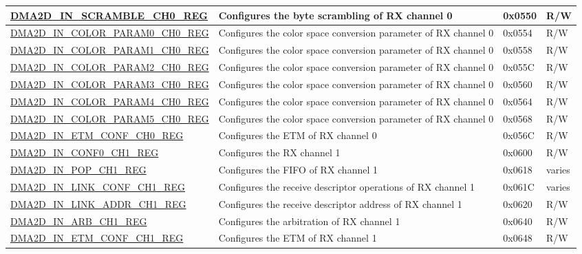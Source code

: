 \begin{longtable}{ | p{7cm} | p{11.5cm} | p{1.3cm} | p{2cm} | }
\hyperref[regdesc:DMA2DINSCRAMBLECH0REG]{DMA2D\_IN\_SCRAMBLE\_CH0\_REG} & Configures the byte scrambling of RX channel 0 & 0x0550 & R/W \\ \hline
\hyperref[regdesc:DMA2DINCOLORPARAM0CH0REG]{DMA2D\_IN\_COLOR\_PARAM0\_CH0\_REG} & Configures the color space conversion parameter of RX channel 0 & 0x0554 & R/W \\ \hline
\hyperref[regdesc:DMA2DINCOLORPARAM1CH0REG]{DMA2D\_IN\_COLOR\_PARAM1\_CH0\_REG} & Configures the color space conversion parameter of RX channel 0 & 0x0558 & R/W \\ \hline
\hyperref[regdesc:DMA2DINCOLORPARAM2CH0REG]{DMA2D\_IN\_COLOR\_PARAM2\_CH0\_REG} & Configures the color space conversion parameter of RX channel 0 & 0x055C & R/W \\ \hline
\hyperref[regdesc:DMA2DINCOLORPARAM3CH0REG]{DMA2D\_IN\_COLOR\_PARAM3\_CH0\_REG} & Configures the color space conversion parameter of RX channel 0 & 0x0560 & R/W \\ \hline
\hyperref[regdesc:DMA2DINCOLORPARAM4CH0REG]{DMA2D\_IN\_COLOR\_PARAM4\_CH0\_REG} & Configures the color space conversion parameter of RX channel 0 & 0x0564 & R/W \\ \hline
\hyperref[regdesc:DMA2DINCOLORPARAM5CH0REG]{DMA2D\_IN\_COLOR\_PARAM5\_CH0\_REG} & Configures the color space conversion parameter of RX channel 0 & 0x0568 & R/W \\ \hline
\hyperref[regdesc:DMA2DINETMCONFCHNREG]{DMA2D\_IN\_ETM\_CONF\_CH0\_REG} & Configures the ETM of RX channel 0 & 0x056C & R/W \\ \hline
\hyperref[regdesc:DMA2DINCONF0CHNREG]{DMA2D\_IN\_CONF0\_CH1\_REG} & Configures the RX channel 1 & 0x0600 & R/W \\ \hline
\hyperref[regdesc:DMA2DINPOPCHNREG]{DMA2D\_IN\_POP\_CH1\_REG} & Configures the FIFO of RX channel 1 & 0x0618 & varies \\ \hline
\hyperref[regdesc:DMA2DINLINKCONFCHNREG]{DMA2D\_IN\_LINK\_CONF\_CH1\_REG} & Configures the receive descriptor operations of RX channel 1 & 0x061C & varies \\ \hline
\hyperref[regdesc:DMA2DINLINKADDRCHNREG]{DMA2D\_IN\_LINK\_ADDR\_CH1\_REG} & Configures the receive descriptor address of RX channel 1 & 0x0620 & R/W \\ \hline
\hyperref[regdesc:DMA2DINARBCHNREG]{DMA2D\_IN\_ARB\_CH1\_REG} & Configures the arbitration of RX channel 1 & 0x0640 & R/W \\ \hline
\hyperref[regdesc:DMA2DINETMCONFCHNREG]{DMA2D\_IN\_ETM\_CONF\_CH1\_REG} & Configures the ETM of RX channel 1 & 0x0648 & R/W \\ \hline

\end{longtable}
